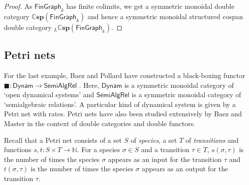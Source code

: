 \documentclass[oneside,final]{ucr}
\theoremstyle{definition}
\newcommand{\maps}{\colon}
\newcommand{\Rel}{\mathsf{Rel}}
\newcommand{\Dynam}{\mathsf{Dynam}}
\newcommand{\SemiAlg}{\mathsf{SemiAlg}}
\begin{document}
{\begin{proof}
As $\mathsf{FinGraph}_k$ has finite colimits, we get a symmetric monoidal double category $\mathbb{C}\mathbf{sp}(\mathsf{FinGraph}_k)$ and hence a symmetric monoidal structured cospan double category $_L \mathbb{C}\mathbf{sp}(\mathsf{FinGraph}_k)$.
\end{proof}

\subsection{Petri nets}\label{petri_nets_structured_cospans}
For the last example, Baez and Pollard have constructed a black-boxing functor $\blacksquare \maps \Dynam \to \SemiAlg\Rel$ \cite{BP}. Here, $\Dynam$ is a symmetric monoidal category of `open dynamical systems' and $\SemiAlg\Rel$ is a symmetric monoidal category of `semialgebraic relations'. A particular kind of dynamical system is given by a Petri net with rates. Petri nets have also been studied extensively by Baez and Master \cite{BM} in the context of double categories and double functors.

Recall that a Petri net consists of a set $S$ of \emph{species}, a set $T$ of \emph{transitions} and functions $s,t \maps S \times T \to \mathbb{N}$. For a species $\sigma \in S$ and a transition $\tau \in T$, $s(\sigma,\tau)$ is the number of times the species $\sigma$ appears as an input for the transition $\tau$ and $t(\sigma,\tau)$ is the number of times the species $\sigma$ appears as an output for the transition $\tau$. 

}
\end{document}
